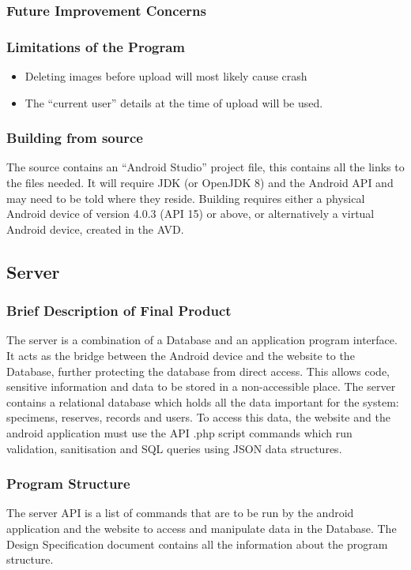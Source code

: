     \subsubsection{Future Improvement Concerns}


    \subsubsection{Limitations of the Program}
        \begin{itemize}
            \item Deleting images before upload will most likely cause crash
            \item The ``current user'' details at the time of upload will be used.
        \end{itemize}

    \subsubsection{Building from source}
        The source contains an ``Android Studio'' project file, this contains all the links to the files needed. It will require JDK (or OpenJDK 8) and the Android API and may need to be told where they reside. Building requires either a physical Android device of version 4.0.3 (API 15) or above, or alternatively a virtual Android device, created in the AVD.

\subsection{Server}
    \subsubsection{Brief Description of Final Product}
        The server is a combination of a Database and an application program interface. It acts as the bridge between the Android device and the website to the Database, further protecting the database from direct access. This allows code, sensitive information and data to be stored in a non-accessible place. The server contains a relational database which holds all the data important for the system: specimens, reserves, records and users. To access this data, the website and the android application must use the API .php script commands which run validation, sanitisation and SQL queries using JSON data structures. 

    \subsubsection{Program Structure}
        The server API is a list of commands that are to be run by the android application and the website to access and manipulate data in the Database. The Design Specification document contains all the information about the program structure.


